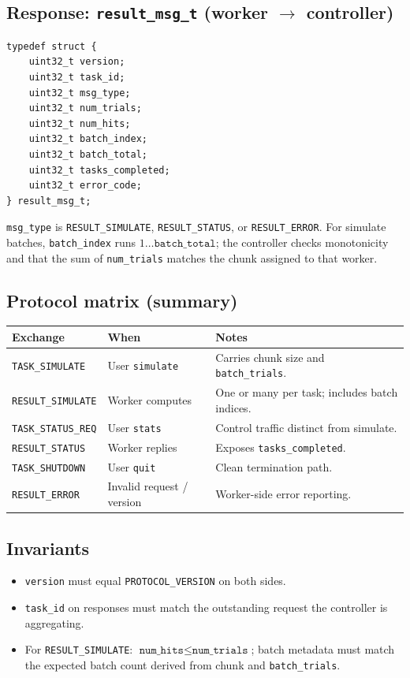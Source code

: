 \documentclass[11pt]{article}
\begin{document}
\subsection{Response: \texorpdfstring{\texttt{result\_msg\_t} (worker $\rightarrow$ controller)}{\texttt{result\_msg\_t} (worker to controller)}}
\begin{lstlisting}
typedef struct {
    uint32_t version;
    uint32_t task_id;
    uint32_t msg_type;
    uint32_t num_trials;
    uint32_t num_hits;
    uint32_t batch_index;
    uint32_t batch_total;
    uint32_t tasks_completed;
    uint32_t error_code;
} result_msg_t;
\end{lstlisting}
\texttt{msg\_type} is \texttt{RESULT\_SIMULATE}, \texttt{RESULT\_STATUS}, or \texttt{RESULT\_ERROR}. For simulate batches, \texttt{batch\_index} runs $1\ldots\texttt{batch\_total}$; the controller checks monotonicity and that the sum of \texttt{num\_trials} matches the chunk assigned to that worker.

\subsection{Protocol matrix (summary)}
\begin{table}[ht]
  \centering
  \small
  \begin{tabularx}{\linewidth}{l l X}
    \toprule
    Exchange & When & Notes \\
    \midrule
    \texttt{TASK\_SIMULATE} & User \texttt{simulate} & Carries chunk size and \texttt{batch\_trials}. \\
    \texttt{RESULT\_SIMULATE} & Worker computes & One or many per task; includes batch indices. \\
    \texttt{TASK\_STATUS\_REQ} & User \texttt{stats} & Control traffic distinct from simulate. \\
    \texttt{RESULT\_STATUS} & Worker replies & Exposes \texttt{tasks\_completed}. \\
    \texttt{TASK\_SHUTDOWN} & User \texttt{quit} & Clean termination path. \\
    \texttt{RESULT\_ERROR} & Invalid request / version & Worker-side error reporting. \\
    \bottomrule
  \end{tabularx}
\end{table}

\subsection{Invariants}
\begin{itemize}
  \item \texttt{version} must equal \texttt{PROTOCOL\_VERSION} on both sides.
  \item \texttt{task\_id} on responses must match the outstanding request the controller is aggregating.
  \item For \texttt{RESULT\_SIMULATE}: $\texttt{num\_hits} \le \texttt{num\_trials}$; batch metadata must match the expected batch count derived from chunk and \texttt{batch\_trials}.
\end{itemize}
\end{document}
